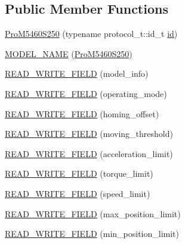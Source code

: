 \subsection*{Public Member Functions}
\begin{DoxyCompactItemize}
\item 
\hyperlink{classdynamixel_1_1servos_1_1_pro_m5460_s250_ab6654ef454e1159aec5b5530e5fa24aa}{Pro\+M5460\+S250} (typename protocol\+\_\+t\+::id\+\_\+t \hyperlink{classdynamixel_1_1servos_1_1_servo_a2d022081672e25a7bb57b76706e1cc57}{id})
\item 
\hyperlink{classdynamixel_1_1servos_1_1_pro_m5460_s250_a3de076aa893c2c7ee4d5cb44b9c3290c}{M\+O\+D\+E\+L\+\_\+\+N\+A\+M\+E} (\hyperlink{classdynamixel_1_1servos_1_1_pro_m5460_s250}{Pro\+M5460\+S250})
\item 
\hyperlink{classdynamixel_1_1servos_1_1_pro_m5460_s250_a76e2307edb9cc8b19bb9be7694edb586}{R\+E\+A\+D\+\_\+\+W\+R\+I\+T\+E\+\_\+\+F\+I\+E\+L\+D} (model\+\_\+info)
\item 
\hyperlink{classdynamixel_1_1servos_1_1_pro_m5460_s250_a8778c8a5bbb21134a8db27d50664b88b}{R\+E\+A\+D\+\_\+\+W\+R\+I\+T\+E\+\_\+\+F\+I\+E\+L\+D} (operating\+\_\+mode)
\item 
\hyperlink{classdynamixel_1_1servos_1_1_pro_m5460_s250_a3b2df77acb2c22a725cf7402194bc22e}{R\+E\+A\+D\+\_\+\+W\+R\+I\+T\+E\+\_\+\+F\+I\+E\+L\+D} (homing\+\_\+offset)
\item 
\hyperlink{classdynamixel_1_1servos_1_1_pro_m5460_s250_a721cbeed3a07bd240376136e20061549}{R\+E\+A\+D\+\_\+\+W\+R\+I\+T\+E\+\_\+\+F\+I\+E\+L\+D} (moving\+\_\+threshold)
\item 
\hyperlink{classdynamixel_1_1servos_1_1_pro_m5460_s250_ac997e390079e5cdda47c2a1307d6285b}{R\+E\+A\+D\+\_\+\+W\+R\+I\+T\+E\+\_\+\+F\+I\+E\+L\+D} (acceleration\+\_\+limit)
\item 
\hyperlink{classdynamixel_1_1servos_1_1_pro_m5460_s250_afa0c42e9a857962a1f6390c19f5071d4}{R\+E\+A\+D\+\_\+\+W\+R\+I\+T\+E\+\_\+\+F\+I\+E\+L\+D} (torque\+\_\+limit)
\item 
\hyperlink{classdynamixel_1_1servos_1_1_pro_m5460_s250_ac2caece24901f4a6ab7358bc29f4da33}{R\+E\+A\+D\+\_\+\+W\+R\+I\+T\+E\+\_\+\+F\+I\+E\+L\+D} (speed\+\_\+limit)
\item 
\hyperlink{classdynamixel_1_1servos_1_1_pro_m5460_s250_a6af98e9cad0fc385e01dc011ea6fe473}{R\+E\+A\+D\+\_\+\+W\+R\+I\+T\+E\+\_\+\+F\+I\+E\+L\+D} (max\+\_\+position\+\_\+limit)
\item 
\hyperlink{classdynamixel_1_1servos_1_1_pro_m5460_s250_adcac24cea2a39d6b02a7289dd352a3f2}{R\+E\+A\+D\+\_\+\+W\+R\+I\+T\+E\+\_\+\+F\+I\+E\+L\+D} (min\+\_\+position\+\_\+limit)

\end{DoxyCompactItemize}
